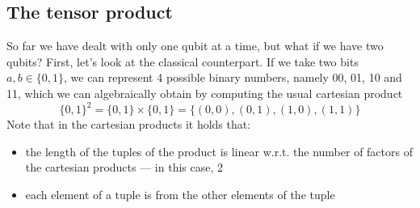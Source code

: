 \documentclass[a4paper, 12pt]{report}
\begin{document}

\subsection{The tensor product}

So far we have dealt with only one qubit at a time, but what if we have two qubits? First, let's look at the classical counterpart. If we take two bits $a, b \in \{0, 1\}$, we can represent 4 possible binary numbers, namely 00, 01, 10 and 11, which we can algebraically obtain by computing the usual cartesian product $$\{0, 1\}^2 = \{0, 1\} \times \{0, 1\} = \{(0, 0), (0, 1), (1, 0), (1, 1)\}$$ Note that in the cartesian products it holds that:

\begin{itemize}
	\item the length of the tuples of the product is linear w.r.t. the number of factors of the cartesian products --- in this case, 2
	\item each element of a tuple is  from the other elements of the tuple
\end{itemize}
\end{document}
